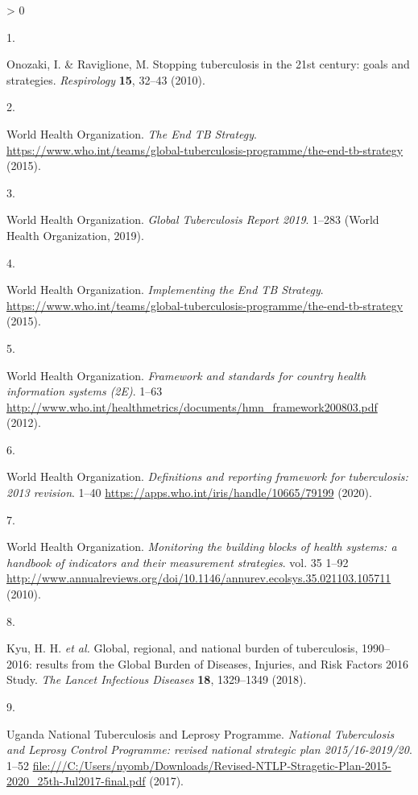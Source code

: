 \documentclass[
]{article}
\newlength{\cslhangindent}
\newlength{\csllabelwidth}
\newenvironment{CSLReferences}[2] %
 {%
  \setlength{\parindent}{0pt}
  \ifodd #1 \everypar{\setlength{\hangindent}{\cslhangindent}}\ignorespaces\fi
  \ifnum #2 > 0
  \setlength{\parskip}{#2\baselineskip}
  \fi
 }%
 {}
\newcommand{\CSLLeftMargin}[1]{\parbox[t]{\csllabelwidth}{#1}}
\newcommand{\CSLRightInline}[1]{\parbox[t]{\linewidth - \csllabelwidth}{#1}\break}
\begin{document}
\hypertarget{refs}{}
\begin{CSLReferences}{0}{0}
\leavevmode\hypertarget{ref-Onozaki2010}{}%
\CSLLeftMargin{1. }
\CSLRightInline{Onozaki, I. \& Raviglione, M. {Stopping tuberculosis in the 21st century: goals and strategies}. \emph{Respirology} \textbf{15}, 32--43 (2010).}

\leavevmode\hypertarget{ref-WorldHealthOrganization2015a}{}%
\CSLLeftMargin{2. }
\CSLRightInline{World Health Organization. \emph{{The End TB Strategy}}. \url{https://www.who.int/teams/global-tuberculosis-programme/the-end-tb-strategy} (2015).}

\leavevmode\hypertarget{ref-WorldHealthOrganization2019}{}%
\CSLLeftMargin{3. }
\CSLRightInline{World Health Organization. \emph{{Global Tuberculosis Report 2019}}. 1--283 (World Health Organization, 2019).}

\leavevmode\hypertarget{ref-WorldHealthOrganization2015}{}%
\CSLLeftMargin{4. }
\CSLRightInline{World Health Organization. \emph{{Implementing the End TB Strategy}}. \url{https://www.who.int/teams/global-tuberculosis-programme/the-end-tb-strategy} (2015).}

\leavevmode\hypertarget{ref-WHOWorldHealthOrganization2008}{}%
\CSLLeftMargin{5. }
\CSLRightInline{World Health Organization. \emph{{Framework and standards for country health information systems (2E)}}. 1--63 \url{http://www.who.int/healthmetrics/documents/hmn_framework200803.pdf} (2012).}

\leavevmode\hypertarget{ref-WorldHealthOrganization2020}{}%
\CSLLeftMargin{6. }
\CSLRightInline{World Health Organization. \emph{{Definitions and reporting framework for tuberculosis: 2013 revision}}. 1--40 \url{https://apps.who.int/iris/handle/10665/79199} (2020).}

\leavevmode\hypertarget{ref-WorldHealthOrganization2010}{}%
\CSLLeftMargin{7. }
\CSLRightInline{World Health Organization. \emph{{Monitoring the building blocks of health systems: a handbook of indicators and their measurement strategies}}. vol. 35 1--92 \url{http://www.annualreviews.org/doi/10.1146/annurev.ecolsys.35.021103.105711} (2010).}

\leavevmode\hypertarget{ref-Kyu2018}{}%
\CSLLeftMargin{8. }
\CSLRightInline{Kyu, H. H. \emph{et al.} {Global, regional, and national burden of tuberculosis, 1990--2016: results from the Global Burden of Diseases, Injuries, and Risk Factors 2016 Study}. \emph{The Lancet Infectious Diseases} \textbf{18}, 1329--1349 (2018).}

\leavevmode\hypertarget{ref-UgandaNationalTuberculosisandLeprosyProgramme2017a}{}%
\CSLLeftMargin{9. }
\CSLRightInline{Uganda National Tuberculosis and Leprosy Programme. \emph{{National Tuberculosis and Leprosy Control Programme: revised national strategic plan 2015/16-2019/20}}. 1--52 \url{file:///C:/Users/nyomb/Downloads/Revised-NTLP-Stragetic-Plan-2015-2020_25th-Jul2017-final.pdf} (2017).}


\end{CSLReferences}
\end{document}

